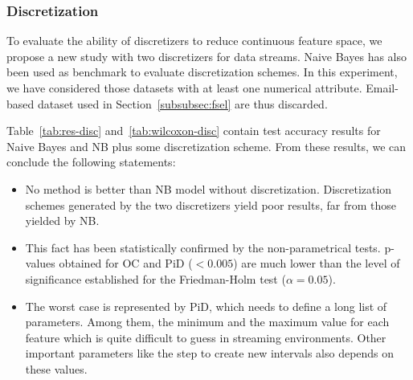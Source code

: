 \documentclass[preprint,12pt]{elsarticle}
\begin{document}
\subsubsection*{\textbf{Discretization}}

To evaluate the ability of discretizers to reduce continuous feature space, we propose a new study with two discretizers for data streams. Naive Bayes has also been used as benchmark to evaluate discretization schemes. In this experiment, we have considered those datasets with at least one numerical attribute. Email-based dataset used in Section~\ref{subsubsec:fsel} are thus discarded.

Table~\ref{tab:res-disc} and~\ref{tab:wilcoxon-disc} contain test accuracy results for Naive Bayes and NB plus some discretization scheme. From these results, we can conclude the following statements:

\begin{itemize}
	\item No method is better than NB model without discretization. Discretization schemes generated by the two discretizers yield poor results, far from those yielded by NB. 
	\item This fact has been statistically confirmed by the non-parametrical tests. p-values obtained for OC and PiD ($<0.005$) are much lower than the level of significance established for the Friedman-Holm test ($\alpha = 0.05$).
	\item The worst case is represented by PiD, which needs to define a long list of parameters. Among them, the minimum and the maximum value for each feature which is quite difficult to guess in streaming environments. Other important parameters like the step to create new intervals also depends on these values.
\end{itemize}
\end{document}
